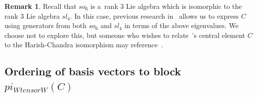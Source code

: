 \documentclass[10pt,a4paper]{amsart}
\numberwithin{equation}{section}
\theoremstyle{definition}
\newtheorem{Remark}[Theorem]{Remark}
\def\boldsymbol#1{#1}
\def\mathfrak#1{#1}
\def\pi{pi}
\def\otimes{ tensor }
\begin{document}
\begin{Remark}
 Recall that $\mathfrak{so}_6$ is a~rank 3 Lie algebra which is isomorphic to the rank 3 Lie algebra $\mathfrak{sl}_4$. In this case, previous research in~\cite{HarishChandraComment} allows us to express $C$ using generators from both $\mathfrak{so}_6$ and $\mathfrak{sl}_4$ in terms of the above eigenvalues. We choose not to explore this, but someone who wishes to relate~\cite{kuan2020interactingparticlesystemstype}'s central element $C$ to the Harish-Chandra isomorphism may reference~\cite{HarishChandraComment}.
\end{Remark}

\subsection[Ordering of basis vectors to block pi\_\{W otimes W\}(C)]{Ordering of basis vectors to block $\boldsymbol{\pi_{W\otimes W} (C)}$}
\end{document}
